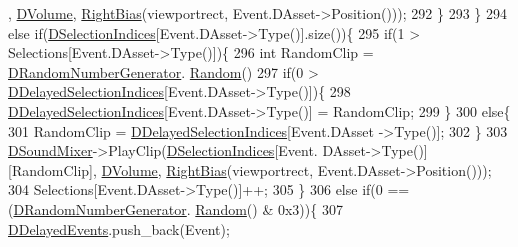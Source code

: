 \begin{DoxyCode}
      , \hyperlink{classCSoundEventRenderer_a3812aeb93aef90635a7da72fc101c686}{DVolume}, \hyperlink{classCSoundEventRenderer_a4be5ff09785c55c3b5b6966fb41eb47f}{RightBias}(viewportrect, Event.DAsset->Position()));
292                         \}
293                     \}
294                     \textcolor{keywordflow}{else} \textcolor{keywordflow}{if}(\hyperlink{classCSoundEventRenderer_afda3dfc8fa16264d91bc56a4bb1d150c}{DSelectionIndices}[Event.DAsset->Type()].size())\{
295                         \textcolor{keywordflow}{if}(1 > Selections[Event.DAsset->Type()])\{
296                             \textcolor{keywordtype}{int} RandomClip = \hyperlink{classCSoundEventRenderer_a591b9430a0f6a70259f87a2467de908f}{DRandomNumberGenerator}.
      \hyperlink{classCRandomNumberGenerator_aa7fc51bde5647d15df2f1b9826702ca2}{Random}() %
297                             \textcolor{keywordflow}{if}(0 > \hyperlink{classCSoundEventRenderer_ab2103a634f4ba6d12824ecddf6693870}{DDelayedSelectionIndices}[Event.DAsset->Type()])\{
298                                 \hyperlink{classCSoundEventRenderer_ab2103a634f4ba6d12824ecddf6693870}{DDelayedSelectionIndices}[Event.DAsset->Type()] = 
      RandomClip;
299                             \}
300                             \textcolor{keywordflow}{else}\{
301                                 RandomClip = \hyperlink{classCSoundEventRenderer_ab2103a634f4ba6d12824ecddf6693870}{DDelayedSelectionIndices}[Event.DAsset
      ->Type()];    
302                             \}
303                             \hyperlink{classCSoundEventRenderer_a5abf598a7e8783d9cc78e0d33a65c9c2}{DSoundMixer}->PlayClip(\hyperlink{classCSoundEventRenderer_afda3dfc8fa16264d91bc56a4bb1d150c}{DSelectionIndices}[Event.
      DAsset->Type()][RandomClip], \hyperlink{classCSoundEventRenderer_a3812aeb93aef90635a7da72fc101c686}{DVolume}, \hyperlink{classCSoundEventRenderer_a4be5ff09785c55c3b5b6966fb41eb47f}{RightBias}(viewportrect, Event.DAsset->Position()));
304                             Selections[Event.DAsset->Type()]++;
305                         \}
306                         \textcolor{keywordflow}{else} \textcolor{keywordflow}{if}(0 == (\hyperlink{classCSoundEventRenderer_a591b9430a0f6a70259f87a2467de908f}{DRandomNumberGenerator}.
      \hyperlink{classCRandomNumberGenerator_aa7fc51bde5647d15df2f1b9826702ca2}{Random}() & 0x3))\{
307                             \hyperlink{classCSoundEventRenderer_a896d5c4717b407fdb6567aed87da3e50}{DDelayedEvents}.push\_back(Event);

\end{DoxyCode}
